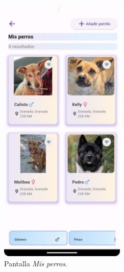 \documentclass[a4paper, 12pt]{article}
\begin{document}
\begin{figure}[H]
	\begin{center}
		{\includegraphics[width=6cm]{app/MyDogs.png}\par}
		\caption{Pantalla \textit{Mis perros}.}
	\end{center}  
\end{figure}
\end{document}
